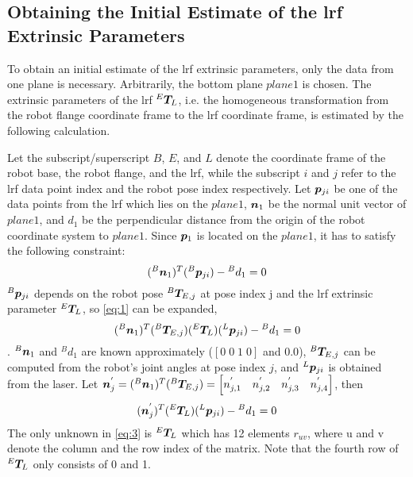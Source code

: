 \subsection{Obtaining the Initial Estimate of the \ac{lrf} Extrinsic Parameters}
\label{sec:first_step}
To obtain an initial estimate of the \ac{lrf} extrinsic parameters, only the data from one plane is necessary. Arbitrarily, the bottom plane $plane 1$ is chosen. The extrinsic parameters of the \ac{lrf} ${^E}\vb*{T}_L$, i.e. the homogeneous transformation from the robot flange coordinate frame to the \ac{lrf} coordinate frame, is estimated by the following calculation. 

Let the subscript/superscript $B$, $E$, and $L$ denote the coordinate frame of the robot base, the robot flange, and the \ac{lrf}, while the subscript $i$ and $j$ refer to the \ac{lrf} data point index and the robot pose index respectively. Let $\vb*{p}_{ji}$ be one of the data points from the \ac{lrf} which lies on the $plane 1$, $\vb*{n}_1$ be the normal unit vector of $plane 1$, and $d_1$ be the perpendicular distance from the origin of the robot coordinate system to $plane 1$.  Since $\vb*{p}_1$ is located on the $plane 1$, it has to satisfy the following constraint:
  \begin{equation}
  \label{eq:1}
  ({^B}\vb*{n}_1) ^T ({^B}\vb*{p}_{ji}) - {^B}d_1 = 0
   \end{equation}
${^B}\vb*{p}_{ji}$ depends on the robot pose ${^B}\vb*{T}_{E,j}$ at pose index j and the \ac{lrf} extrinsic parameter ${^E}\vb*{T}_L$, so \eqref{eq:1}  can be expanded,
  \begin{equation}
  ({^B}\vb*{n}_1) ^T ({^B}\vb*{T}_{E,j}) ({^E}\vb*{T}_L) ({^L}\vb*{p}_{ji}) - {^B}d_1 = 0
  \end{equation}.
${^B}\vb*{n}_1$ and $^{B}d_1$ are known approximately ($[0 \; 0\; 1\;0]$ and $0.0$), ${^B}\vb*{T}_{E,j}$ can be computed from the robot's joint angles at pose index $j$, and ${^L}\vb*{p}_{ji}$ is obtained from the laser. Let $\vb*{n}^{'}_j = ({^B}\vb*{n}_1) ^T ({^B}\vb*{T}_{E,j}) = 
\left[n^{'}_{j,1} \quad n^{'}_{j,2} \quad n^{'}_{j,3}  \quad n^{'}_{j,4} \right]$, then  
  \begin{equation}
  \label{eq:3}
  (\vb*{n}^{'}_j) ^T ({^E}\vb*{T}_L) ({^L}\vb*{p}_{ji}) - {^B}d_1 = 0
  \end{equation}
The only unknown in \eqref{eq:3} is ${^E}\vb*{T}_L$ which has 12 elements $r_{uv}$, where u and v denote the column and the row index of the matrix. Note that the fourth row of ${^E}\vb*{T}_L$ only consists of 0 and 1. 
